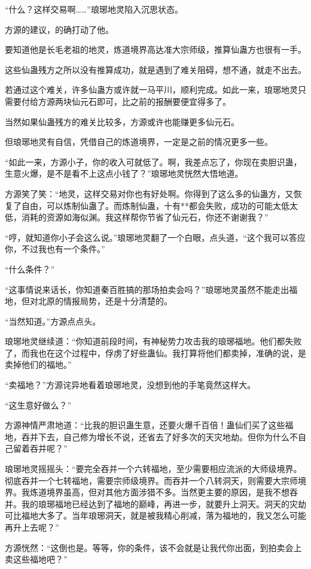 \begin{this_body}
“什么？这样交易啊……”琅琊地灵陷入沉思状态。

方源的建议，的确打动了他。

要知道他是长毛老祖的地灵，炼道境界高达准大宗师级，推算仙蛊方也很有一手。

这些仙蛊残方之所以没有推算成功，就是遇到了难关阻碍，想不通，就走不出去。

若通过这个难关，许多仙蛊方或许就一马平川，顺利完成。如此一来，琅琊地灵只需要付给方源两块仙元石即可，比之前的报酬要便宜得多了。

当然如果仙蛊残方的难关比较多，方源或许也能赚更多仙元石。

但琅琊地灵有自信，凭借自己的炼道境界，一定是之前的情况更多一些。

“如此一来，方源小子，你的收入可就低了。啊，我差点忘了，你现在卖胆识蛊，生意火爆，是不是看不上这点小钱了？”琅琊地灵恍然大悟地道。

方源笑了笑：“地灵，这样交易对你也有好处啊。你得到了这么多的仙蛊方，又恢复了自由，可以炼制仙蛊了。而炼制仙蛊，十有**都会失败，成功的可能太低太低，消耗的资源如海似渊。我这样帮你节省了仙元石，你还不谢谢我？”

“哼，就知道你小子会这么说。”琅琊地灵翻了一个白眼，点头道，“这个我可以答应你，不过我也有一个条件。”

“什么条件？”

“这事情说来话长，你知道秦百胜搞的那场拍卖会吗？”琅琊地灵虽然不能走出福地，但对北原的情报局势，还是十分清楚的。

“当然知道。”方源点点头。

琅琊地灵继续道：“你知道前段时间，有神秘势力攻击我的琅琊福地。他们都失败了，而我也在这个过程中，俘虏了好些蛊仙。我打算将他们都卖掉，准确的说，是卖掉他们的福地。”

“卖福地？”方源诧异地看着琅琊地灵，没想到他的手笔竟然这样大。

“这生意好做么？”

方源神情严肃地道：“比我的胆识蛊生意，还要火爆千百倍！蛊仙们买了这些福地，吞并下去，自己修为增长不说，还省去了好多次的天灾地劫。但你为什么不自己留着吞并呢？”

琅琊地灵摇摇头：“要完全吞并一个六转福地，至少需要相应流派的大师级境界。彻底吞并一个七转福地，需要宗师级境界。而吞并一个八转洞天，则需要大宗师境界。我炼道境界虽高，但对其他方面涉猎不多。当然更主要的原因，是我不想吞并。我的琅琊福地已经达到了福地的巅峰，再进一步，就要升上洞天。洞天的灾劫可比福地大多了。当年琅琊洞天，就是被我精心削减，落为福地的，我又怎么可能再升上去呢？”

方源恍然：“这倒也是。等等，你的条件，该不会就是让我代你出面，到拍卖会上卖这些福地吧？”


\end{this_body}
